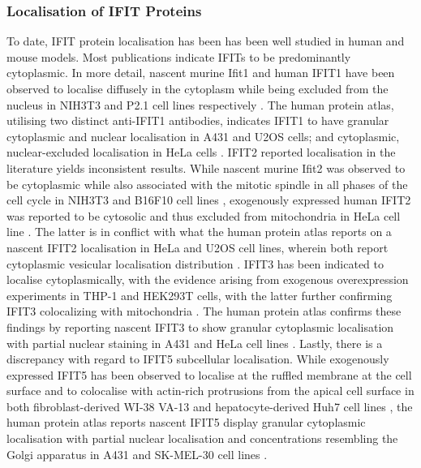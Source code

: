 \subsubsection{Localisation of IFIT Proteins} \label{Localisation of IFIT Proteins}
To date, IFIT protein localisation has been has been well studied in human and mouse models. Most publications indicate IFITs to be predominantly cytoplasmic. In more detail, nascent murine Ifit1 and human IFIT1 have been observed to localise diffusely in the cytoplasm while being excluded from the nucleus in NIH3T3 and P2.1 cell lines respectively \cite{Pichlmair2011IFIT1RNA, Terenzi2008Interferon-inducibleE1}. The human protein atlas, utilising two distinct anti-IFIT1 antibodies, indicates IFIT1 to have granular cytoplasmic and nuclear localisation in A431 and U2OS cells; and cytoplasmic, nuclear-excluded localisation in HeLa cells \cite{Thul2017AProteome}. IFIT2 reported localisation in the literature yields inconsistent results. While nascent murine Ifit2 was observed to be cytoplasmic while also associated with the mitotic spindle in all phases of the cell cycle in NIH3T3 and B16F10 cell lines \cite{Saha2006IdentificationProtein}, exogenously expressed human IFIT2 was reported to be cytosolic and thus excluded from mitochondria in HeLa cell line \cite{Stawowczyk2011TheApoptosis}. The latter is in conflict with what the human protein atlas reports on a nascent IFIT2 localisation in HeLa and U2OS cell lines, wherein both report cytoplasmic vesicular localisation distribution \cite{Thul2017AProteome}. IFIT3 has been indicated to localise cytoplasmically, with the evidence arising from exogenous overexpression experiments in THP-1 and HEK293T cells, with the latter further confirming IFIT3 colocalizing with mitochondria \cite{Huang2008Interferon-inducedCells, Liu2011IFN-InducedTBK1}. The human protein atlas confirms these findings by reporting nascent IFIT3 to show granular cytoplasmic localisation with partial nuclear staining in A431 and HeLa cell lines \cite{Thul2017AProteome}. Lastly, there is a discrepancy with regard to IFIT5 subcellular localisation. While exogenously expressed IFIT5 has been observed to localise at the ruffled membrane at the cell surface and to colocalise with actin-rich protrusions from the apical cell surface in both fibroblast-derived WI-38 VA-13 and hepatocyte-derived Huh7 cell lines \cite{Katibah2013TRNAIFIT5}, the human protein atlas reports nascent IFIT5 display granular cytoplasmic localisation with partial nuclear localisation and concentrations resembling the Golgi apparatus in A431 and SK-MEL-30 cell lines \cite{Thul2017AProteome}. 

